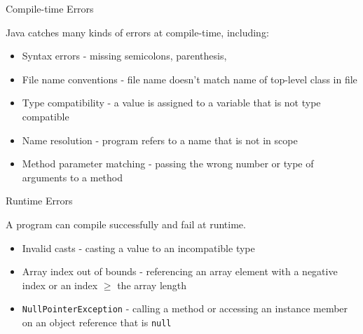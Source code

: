 \documentclass{beamer}
\begin{document}
\begin{frame}[fragile]{Compile-time Errors}


Java catches many kinds of errors at compile-time, including:
\begin{itemize}
\item Syntax errors - missing semicolons, parenthesis, 
\item File name conventions - file name doesn't match name of top-level class in file
\item Type compatibility - a value is assigned to a variable that is not type compatible
\item Name resolution - program refers to a name that is not in scope
\item Method parameter matching - passing the wrong number or type of arguments to a method
\end{itemize}

\end{frame}

\begin{frame}[fragile]{Runtime Errors}


A program can compile successfully and fail at runtime.
\begin{itemize}
\item Invalid casts - casting a value to an incompatible type
\item Array index out of bounds - referencing an array element with a negative index or an index $\ge$ the array length
\item {\tt NullPointerException} - calling a method or accessing an instance member on an object reference that is {\tt null}
\end{itemize}

\end{frame}
\end{document}
